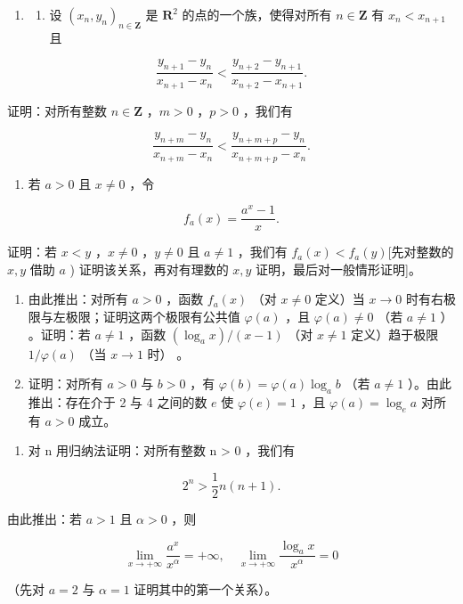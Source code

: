 \ExerciseSection

\begin{enumerate}
\def\labelenumi{\arabic{enumi})}
\tightlist
\item
  \begin{enumerate}
  \def\labelenumii{\alph{enumii})}
  \tightlist
  \item
    设 \((x_{n}, y_{n})_{n \in \mathbf{Z}}\) 是 \(\mathbf{R}^{2}\) 的点的一个族，使得对所有 \(n \in \mathbf{Z}\) 有 \(x_{n} < x_{n+1}\) 且
  \end{enumerate}
\end{enumerate}

\[
\frac {y _ {n + 1} - y _ {n}}{x _ {n + 1} - x _ {n}} <   \frac {y _ {n + 2} - y _ {n + 1}}{x _ {n + 2} - x _ {n + 1}}.
\]

证明：对所有整数 \(n \in \mathbf{Z}\) ，\(m > 0\) ，\(p > 0\) ，我们有

\[
\frac {y _ {n + m} - y _ {n}}{x _ {n + m} - x _ {n}} <   \frac {y _ {n + m + p} - y _ {n}}{x _ {n + m + p} - x _ {n}}.
\]

\begin{enumerate}
\def\labelenumi{\alph{enumi})}
\setcounter{enumi}{1}
\tightlist
\item
  若 \(a > 0\) 且 \(x \neq 0\) ，令
\end{enumerate}

\[
f _ {a} (x) = \frac {a ^ {x} - 1}{x}.
\]

证明：若 \(x < y\) ，\(x \neq 0\) ，\(y \neq 0\) 且 \(a \neq 1\) ，我们有 \(f_{a}(x) < f_{a}(y)\){[}先对整数的 \(x, y\) 借助 \(a\) ) 证明该关系，再对有理数的 \(x, y\) 证明，最后对一般情形证明{]}。

\begin{enumerate}
\def\labelenumi{\alph{enumi})}
\setcounter{enumi}{2}
\item
  由此推出：对所有 \(a > 0\) ，函数 \(f_{a}(x)\) （对 \(x \neq 0\) 定义）当 \(x \to 0\) 时有右极限与左极限；证明这两个极限有公共值 \(\varphi(a)\) ，且 \(\varphi(a) \neq 0\) （若 \(a \neq 1\) ） 。证明：若 \(a \neq 1\) ，函数 \((\log_{a} x) / (x - 1)\) （对 \(x \neq 1\) 定义）趋于极限 \(1 / \varphi(a)\) （当 \(x \to 1\) 时） 。
\item
  证明：对所有 \(a > 0\) 与 \(b > 0\) ，有 \(\varphi(b) = \varphi(a) \log_a b\) （若 \(a \neq 1\) ）。由此推出：存在介于 2 与 4 之间的数 \(e\) 使 \(\varphi(e) = 1\) ，且 \(\varphi(a) = \log_e a\) 对所有 \(a > 0\) 成立。
\end{enumerate}

\begin{enumerate}
\def\labelenumi{\arabic{enumi})}
\setcounter{enumi}{1}
\tightlist
\item
  对 n 用归纳法证明：对所有整数 n \textgreater{} 0 ，我们有
\end{enumerate}

\[
2 ^ {n} > \frac {1}{2} n (n + 1).
\]

由此推出：若 \(a > 1\) 且 \(\alpha > 0\) ，则

\[
\lim _ {x \rightarrow + \infty} \frac {a ^ {x}}{x ^ {\alpha}} = + \infty , \quad \lim _ {x \rightarrow + \infty} \frac {\log_ {a} x}{x ^ {\alpha}} = 0
\]

（先对 \(a = 2\) 与 \(\alpha = 1\) 证明其中的第一个关系）。


